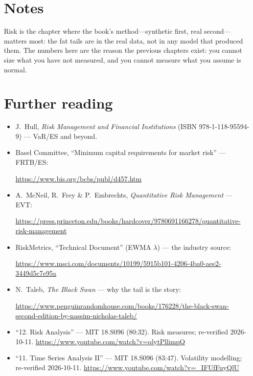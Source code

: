 \section*{Notes}
Risk is the chapter where the book's method---synthetic first, real second---matters
most: the fat tails are in the real data, not in any model that produced them. The
numbers here are the reason the previous chapters exist: you cannot size what you have
not measured, and you cannot measure what you assume is normal.

\section*{Further reading}
\begin{itemize}
\item J.~Hull, \emph{Risk Management and Financial Institutions} (ISBN 978-1-118-95594-9) --- VaR/ES and beyond.
\item Basel Committee, ``Minimum capital requirements for market risk'' --- FRTB/ES:

\url{https://www.bis.org/bcbs/publ/d457.htm}
\item A.~McNeil, R.~Frey \& P.~Embrechts, \emph{Quantitative Risk Management} --- EVT:

\url{https://press.princeton.edu/books/hardcover/9780691166278/quantitative-risk-management}
\item RiskMetrics, ``Technical Document'' (EWMA $\lambda$) --- the industry source:

\url{https://www.msci.com/documents/10199/5915b101-4206-4ba0-aee2-3449d5c7e95a}
\item N.~Taleb, \emph{The Black Swan} --- why the tail is the story:

\url{https://www.penguinrandomhouse.com/books/176228/the-black-swan-second-edition-by-nassim-nicholas-taleb/}
\end{itemize}

\begin{rulebox}
\begin{itemize}
\item ``12. Risk Analysis'' --- MIT 18.S096 (80:32). Risk measures; re-verified 2026-10-11.
\url{https://www.youtube.com/watch?v=qlytPllimpQ}
\item ``11. Time Series Analysis II'' --- MIT 18.S096 (83:47). Volatility modelling;
re-verified 2026-10-11.
\url{https://www.youtube.com/watch?v=_IFUfFuyQlU}
\end{itemize}
\end{rulebox}
